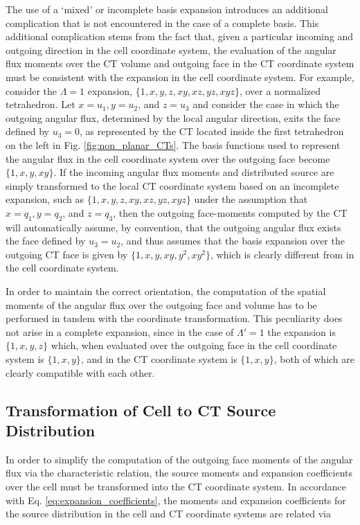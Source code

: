 The use of a ‘mixed’ or incomplete basis expansion introduces an additional complication that is not encountered in the case of a complete basis. This additional complication stems from the fact that, given a particular incoming and outgoing direction in the cell coordinate system, the evaluation of the angular flux moments over the CT volume and outgoing face in the CT coordinate system must be consistent with the expansion in the cell coordinate system. For example, consider the $\Lambda = 1$ expansion, $\{1, x, y, z, xy, xz, yz, xyz \}$, over a normalized tetrahedron. Let $x = u_1, y = u_2$, and $z = u_3$ and consider the case in which the outgoing angular flux, determined by the local angular direction, exits the face defined by $u_3 = 0$, as represented by the CT located inside the first tetrahedron on the left in Fig. \ref{fig:non_planar_CTs}. The basis functions used to represent the angular flux in the cell coordinate system over the outgoing face become $\{ 1, x, y, xy \}$. If the incoming angular flux moments and distributed source are simply transformed to the local CT coordinate system based on an incomplete expansion, such as $\{ 1, x, y, z, xy, xz, yz, xyz \}$ under the assumption that $x = q_1, y = q_2$, and $z = q_3$, then the outgoing face-moments computed by the CT will automatically assume, by convention, that the outgoing angular flux exists the face defined by $u_3 = u_2$, and thus assumes that the basis expansion over the outgoing CT face is given by $\{ 1, x, y, xy, y^2, xy^2 \}$, which is clearly different from in the cell coordinate system.

In order to maintain the correct orientation, the computation of the spatial moments of the angular flux over the outgoing face and volume has to be  performed in tandem with the coordinate transformation. This peculiarity does not arise in a complete expansion, since in the case of $\Lambda ' = 1$ the expansion is $\{ 1, x, y, z \}$ which, when evaluated over the outgoing face in the cell coordinate system is $\{ 1, x, y \}$, and in the CT coordinate system is $\{ 1, x, y \}$, both of which are clearly compatible with each other.

\subsection{Transformation of Cell to CT Source Distribution}

In order to simplify the computation of the outgoing face moments of the angular flux via the characteristic relation, the source moments and expansion coefficients over the cell must be transformed into the CT coordinate system. In accordance with Eq. \ref{eq:expansion_coefficients}, the moments and expansion coefficients for the source distribution in the cell and CT coordinate systems are related via
 
